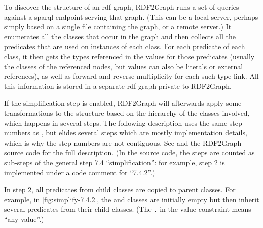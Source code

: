 To discover the structure of an \gls{rdf} graph,
\gls{RDF2Graph} runs a set of queries against a \gls{sparql} endpoint serving that graph.
(This can be a local server, perhaps simply based on a single file containing the graph,
or a remote server.)
It enumerates all the classes that occur in the graph
and then collects all the \glspl{predicate} that are used on instances of each class.
For each \gls{predicate} of each class,
it then gets the types referenced in the values for those \glspl{predicate}
(usually the classes of the referenced nodes,
but values can also be literals or external references),
as well as forward and reverse multiplicity for each such type link.
All this information is stored in a separate \gls{rdf} graph private to \gls{RDF2Graph}.

If the simplification step is enabled,
\gls{RDF2Graph} will afterwards apply some transformations to the structure
based on the hierarchy of the classes involved,
which happens in several steps.
The following description uses the same step numbers as \cite{vanDam2015},
but elides several steps which are mostly implementation details,
which is why the step numbers are not contiguous.
See \cite{vanDam2015} and the \gls{RDF2Graph} source code for the full description.
(In the source code, the steps are counted as sub-steps of the general step 7.4 “simplification”:
for example, step 2 is implemented under a code comment for “7.4.2”.)



In step 2, all \glspl{predicate} from child classes are copied to parent classes.
For example, in \cref{fig:simplify-7.4.2},
the  and  classes are initially empty
but then inherit several \glspl{predicate} from their child classes.
(The \lstinline{.} in the  \gls{value constraint} means “any value”.)

